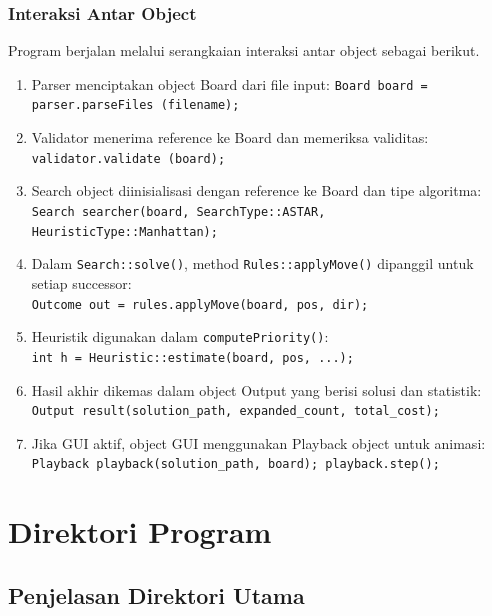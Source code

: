 \subsubsection{Interaksi Antar Object}

Program berjalan melalui serangkaian interaksi antar object sebagai berikut.

\begin{enumerate}
    \item Parser menciptakan object Board dari file input: \texttt{Board board = parser.parseFiles (filename);}

    \item Validator menerima reference ke Board dan memeriksa validitas: \texttt{validator.validate (board);}

    \item Search object diinisialisasi dengan reference ke Board dan tipe algoritma: \texttt{Search searcher(board, SearchType::ASTAR, HeuristicType::Manhattan);}

    \item Dalam \texttt{Search::solve()}, method \texttt{Rules::applyMove()} dipanggil untuk setiap successor: \\
          \texttt{Outcome out = rules.applyMove(board, pos, dir);}

    \item Heuristik digunakan dalam \texttt{computePriority()}: \\
          \texttt{int h = Heuristic::estimate(board, pos, ...);}

    \item Hasil akhir dikemas dalam object Output yang berisi solusi dan statistik: \\
          \texttt{Output result(solution\_path, expanded\_count, total\_cost);}

    \item Jika GUI aktif, object GUI menggunakan Playback object untuk animasi: \\
          \texttt{Playback playback(solution\_path, board); playback.step();}
\end{enumerate}


\section{Direktori Program}


\subsection{Penjelasan Direktori Utama}


